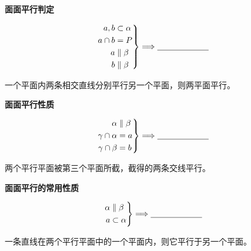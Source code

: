 \documentclass{exam-zh}
\begin{document}
\begin{question}[points=5]
  \textbf{面面平行判定}\par
\[
\left.
\begin{aligned}
a,b&\subset\alpha\\
a\cap b&=P\\
a&\parallel\beta\\
b&\parallel\beta
\end{aligned}
\right\}
\Longrightarrow
\underline{\hspace{22mm}}
\]


  \paren[$\alpha\parallel\beta$]
  \begin{solutionblock}
    一个平面内两条相交直线分别平行另一个平面，则两平面平行。
  \end{solutionblock}
\end{question}



\begin{question}[points=5]
  \textbf{面面平行性质}\par
\[
\left.
\begin{aligned}
\alpha&\parallel\beta\\
\gamma\cap\alpha&=a\\
\gamma\cap\beta&=b
\end{aligned}
\right\}
\Longrightarrow
\underline{\hspace{22mm}}
\]


  \paren[$a\parallel b$]
  \begin{solutionblock}
    两个平行平面被第三个平面所截，截得的两条交线平行。
  \end{solutionblock}
\end{question}



\begin{question}[points=5]
  \textbf{面面平行的常用性质}\par
\[
\left.
\begin{aligned}
\alpha&\parallel\beta\\
a&\subset\alpha
\end{aligned}
\right\}
\Longrightarrow
\underline{\hspace{22mm}}
\]


  \begin{solutionblock}
    一条直线在两个平行平面中的一个平面内，则它平行于另一个平面。
  \end{solutionblock}
\end{question}
\end{document}
